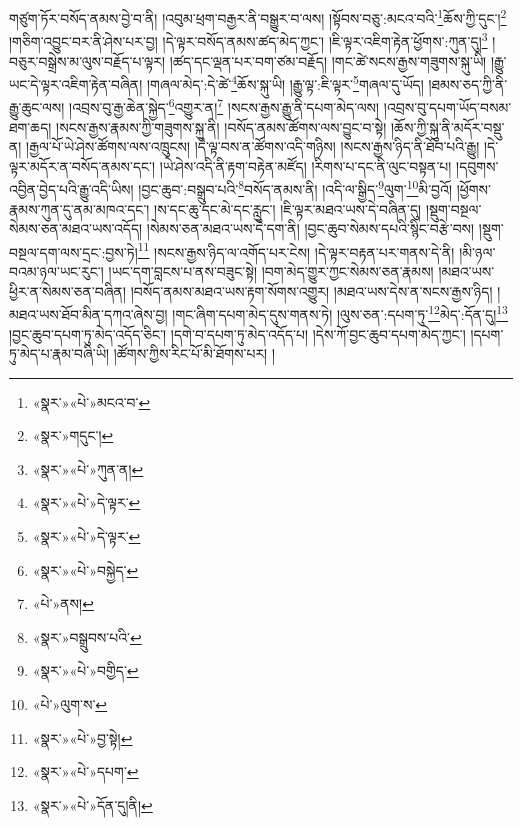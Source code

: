 \documentclass[12pt,a4paper]{book}
\begin{document}
གཙུག་ཏོར་བསོད་ནམས་བྱེ་བ་ནི། །འབུམ་ཕྲག་བརྒྱར་ནི་བསྒྱུར་བ་ལས། །སྟོབས་བཅུ་:མངའ་བའི་\footnote{«སྣར་»«པེ་»མངའ་བ་}ཆོས་ཀྱི་དུང་།\footnote{«སྣར་»གདུང་།} །གཅིག་འབྱུང་བར་ནི་ཤེས་པར་བྱ། །དེ་ལྟར་བསོད་ནམས་ཚད་མེད་ཀྱང་། །ཇི་ལྟར་འཇིག་རྟེན་ཕྱོགས་:ཀུན་དུ།\footnote{«སྣར་»«པེ་»ཀུན་ན།} །བཅུར་བསྒྲེས་མ་ལུས་བརྗོད་པ་ལྟར། །ཚད་དང་ལྡན་པར་བག་ཙམ་བརྗོད། །གང་ཚེ་སངས་རྒྱས་གཟུགས་སྐུ་ཡི། །རྒྱུ་ཡང་དེ་ལྟར་འཇིག་རྟེན་བཞིན། །གཞལ་མེད་:དེ་ཚེ་\footnote{«སྣར་»«པེ་»དེ་ལྟར་}ཆོས་སྐུ་ཡི། །རྒྱུ་ལྟ་:ཇི་ལྟར་\footnote{«སྣར་»«པེ་»དེ་ལྟར་}གཞལ་དུ་ཡོད། །ཐམས་ཅད་ཀྱི་ནི་རྒྱུ་ཆུང་ལས། །འབྲས་བུ་རྒྱ་ཆེན་སྐྱེད་\footnote{«སྣར་»«པེ་»བསྐྱེད་}འགྱུར་ན།\footnote{«པེ་»ནས།} །སངས་རྒྱས་རྒྱུ་ནི་དཔག་མེད་ལས། །འབྲས་བུ་དཔག་ཡོད་བསམ་ཐག་ཆད། །སངས་རྒྱས་རྣམས་ཀྱི་གཟུགས་སྐུ་ནི། །བསོད་ནམས་ཚོགས་ལས་བྱུང་བ་སྟེ། །ཆོས་ཀྱི་སྐུ་ནི་མདོར་བསྡུ་ན། །རྒྱལ་པོ་ཡེ་ཤེས་ཚོགས་ལས་འཁྲུངས། །དེ་ལྟ་བས་ན་ཚོགས་འདི་གཉིས། །སངས་རྒྱས་ཉིད་ནི་ཐོབ་པའི་རྒྱུ། །དེ་ལྟར་མདོར་ན་བསོད་ནམས་དང་། །ཡེ་ཤེས་འདི་ནི་རྟག་བརྟེན་མཛོད། །རིགས་པ་དང་ནི་ལུང་བསྟན་པ། །དབུགས་འབྱིན་བྱེད་པའི་རྒྱུ་འདི་ཡིས། །བྱང་ཆུབ་:བསྒྲུབ་པའི་\footnote{«སྣར་»བསྒྲུབས་པའི་}བསོད་ནམས་ནི། །འདི་ལ་སྒྱིད་\footnote{«སྣར་»«པེ་»བགྱིད་}ལུག་\footnote{«པེ་»ལུག་ས་}མི་བྱའོ། །ཕྱོགས་རྣམས་ཀུན་དུ་ནམ་མཁའ་དང་། །ས་དང་ཆུ་དང་མེ་དང་རླུང་། །ཇི་ལྟར་མཐའ་ཡས་དེ་བཞིན་དུ། །སྡུག་བསྔལ་སེམས་ཅན་མཐའ་ཡས་འདོད། །སེམས་ཅན་མཐའ་ཡས་དེ་དག་ནི། །བྱང་ཆུབ་སེམས་དཔའི་སྙིང་བརྩེ་བས། །སྡུག་བསྔལ་དག་ལས་དྲང་:བྱས་ཏེ།\footnote{«སྣར་»«པེ་»བྱ་སྟེ།} །སངས་རྒྱས་ཉིད་ལ་འགོད་པར་ངེས། །དེ་ལྟར་བརྟན་པར་གནས་དེ་ནི། །མི་ཉལ་བའམ་ཉལ་ཡང་རུང་། །ཡང་དག་བླངས་པ་ནས་བཟུང་སྟེ། །བག་མེད་གྱུར་ཀྱང་སེམས་ཅན་རྣམས། །མཐའ་ཡས་ཕྱིར་ན་སེམས་ཅན་བཞིན། །བསོད་ནམས་མཐའ་ཡས་རྟག་སོགས་འགྱུར། །མཐའ་ཡས་དེས་ན་སངས་རྒྱས་ཉིད། །མཐའ་ཡས་ཐོབ་མིན་དཀའ་ཞེས་བྱ། །གང་ཞིག་དཔག་མེད་དུས་གནས་ཏེ། །ལུས་ཅན་:དཔག་ཏུ་\footnote{«སྣར་»«པེ་»དཔག་}མེད་:དོན་དུ།\footnote{«སྣར་»«པེ་»དོན་དུ།ནི།} །བྱང་ཆུབ་དཔག་ཏུ་མེད་འདོད་ཅིང་། །དགེ་བ་དཔག་ཏུ་མེད་འདོད་པ། །དེས་ཀོ་བྱང་ཆུབ་དཔག་མེད་ཀྱང་། །དཔག་ཏུ་མེད་པ་རྣམ་བཞི་ཡི། །ཚོགས་ཀྱིས་རིང་པོ་མི་ཐོགས་པར། །
\end{document}
